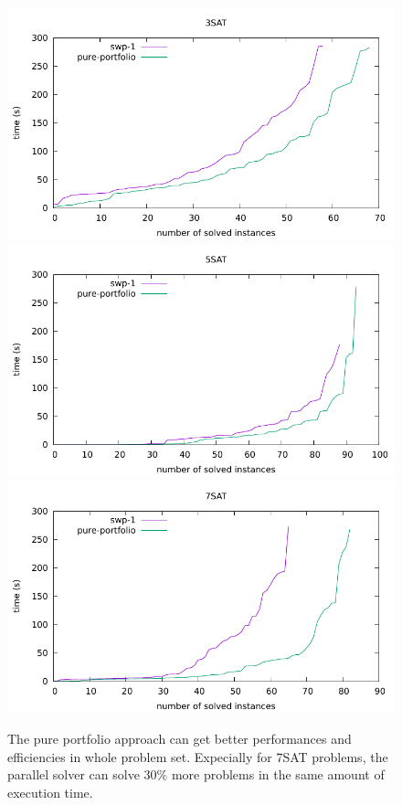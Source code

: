 \documentclass[12pt,a4paper,twoside]{scrartcl}
\numberwithin{equation}{section}
\begin{document}
  \begin{figure}[H]
\begin{center}
  \includegraphics[scale = 1]{Parallel/K3/e1.pdf}
    \includegraphics[scale = 1]{Parallel/K5/e1.pdf}
  \includegraphics[scale = 1]{Parallel/K7/e1.pdf}
  \end{center}
    \label{Experiment 5 all cactus plot}
    \caption{The pure portfolio approach can get better performances and efficiencies in whole problem set. Expecially for 7SAT problems, the parallel solver  can solve $30\%$ more problems in the same amount of execution time. }
  \end{figure}
  \clearpage
\end{document}
